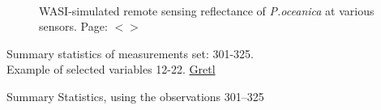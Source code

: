 \documentclass[11pt]{article}
\begin{document}
\begin{appendices}
\begin{figure}[H]
	\centering
	\\
	\caption{WASI-simulated remote sensing reflectance of \textit{P.oceanica} at various sensors. Page: $<$\pageref{page-33}$>$}
	\label{fig:4.6W}
\end{figure}

\begin{table}[H]
	\begin{center}
		\caption{Summary statistics of measurements set: 301-325. \\ Example of selected variables 12-22. \href{http://gretl.sourceforge.net/}{Gretl}­}\label{tab:16}
		Summary Statistics, using the observations 301--325\\
	

\end{center}
\end{table}
\end{appendices}
\end{document}
